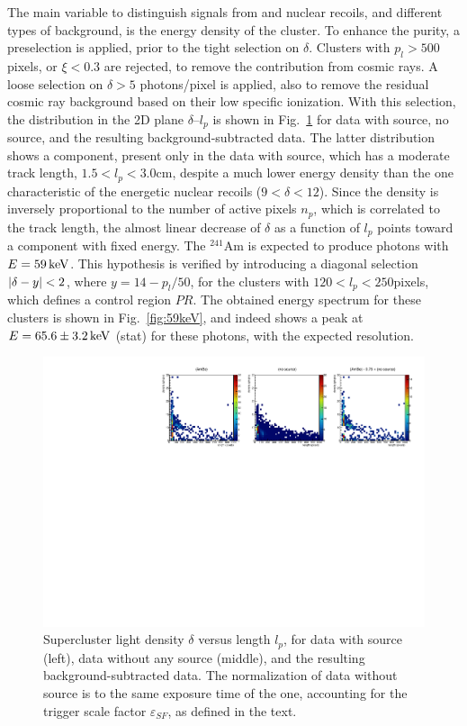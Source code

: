 The main variable to distinguish signals from and nuclear recoils, and
different types of background, is the energy density of the cluster.
To enhance the purity, a preselection is applied, prior to the tight
selection on $\delta$. Clusters with $p_l>500$ pixels, or $\xi<0.3$
are rejected, to remove the contribution from cosmic rays. A loose
selection on $\delta>5$ photons/pixel is applied, also to remove the
residual cosmic ray background based on their low specific ionization.
With this selection, the distribution in the 2D plane $\delta$--$l_p$
is shown in Fig.~\ref{fig:dvsl} for data with \ambe source, no source,
and the resulting background-subtracted \ambe data. The latter
distribution shows a component, present only in the data with \ambe
source, which has a moderate track length, $1.5<l_p<3.0$\unit{cm},
despite a much lower energy density than the one characteristic of the
energetic nuclear recoils ($9<\delta<12$). Since the density is
inversely proportional to the number of active pixels $n_p$, which is
correlated to the track length, the almost linear decrease of $\delta$
as a function of $l_p$ points toward a component with fixed
energy. The $^{241}$Am is expected to produce photons with
$E=59\,\textrm{ke\hspace{-.08em}V}$. This hypothesis is verified by introducing a diagonal
selection $\vert \delta-y \vert<2$, where $y=14-p_l/50$, for the clusters
with $120<l_p<250$\unit{pixels}, which defines a control region
$PR$. The obtained energy spectrum for these clusters is shown in
Fig.~\ref{fig:59keV}, and indeed shows a peak at $E=65.6\pm3.2\,\textrm{ke\hspace{-.08em}V}$
(stat) for these photons, with the expected resolution.

\begin{figure}[ht]
  \begin{center}
  \includegraphics[width=0.90\linewidth]{figures/densityvslength_zoom}

  \caption{Supercluster light density $\delta$ versus length $l_p$,
    for data with \ambe source (left), data without any source
    (middle), and the resulting background-subtracted \ambe data.  The
    normalization of data without source is to the same exposure time
    of the \ambe one, accounting for the trigger scale factor
    $\varepsilon_{SF}$, as defined in the text. \label{fig:dvsl}}

  \end{center}
\end{figure}

